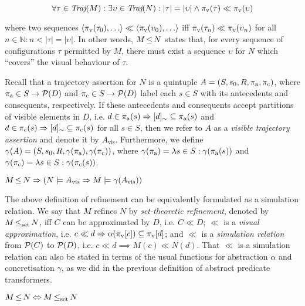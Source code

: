 \begin{equation*}
\forall \tau \in \operatorname{\textit{Traj}}(M) : \exists \upsilon \in \operatorname{\textit{Traj}}(N) : | \tau | = | \upsilon | \wedge \pi_{\textrm{v}}(\tau) \ll \pi_{\textrm{v}}(\upsilon)
\end{equation*}

\noindent where two sequences $\langle \pi_{\textrm{v}}(\tau_{0}), \ldots \rangle \ll \langle \pi_{\textrm{v}}(\upsilon_{0}), \ldots \rangle$ iff $\pi_{\textrm{v}}(\tau_{n}) \ll \pi_{\textrm{v}}(\upsilon_{n})$ for all $n \in \mathbb{N} : n < | \tau | = | \upsilon |$. In other words, $M \operatorname{\leq} N$ states that, for every sequence of configurations $\tau$ permitted by $M$, there must exist a sequence $\upsilon$ for $N$ which ``covers'' the visual behaviour of $\tau$.

Recall that a trajectory assertion for $N$ is a quintuple $A = (S, s_{0}, R, \operatorname{\pi_{\textrm{a}}}, \operatorname{\pi_{\textrm{c}}})$, where $\operatorname{\pi_{\textrm{a}}} \in S \rightarrow \mathcal{P}(D)$ and $\operatorname{\pi_{\textrm{c}}} \in S \rightarrow \mathcal{P}(D)$ label each $s \in S$ with its antecedents and consequents, respectively. If these antecedents and consequents accept partitions of visible elements in $D$, i.e. $d \in \operatorname{\pi_{\textrm{a}}}(s) \Rightarrow [d]_{\sim} \subseteq \operatorname{\pi_{\textrm{a}}}(s)$ and $d \in \operatorname{\pi_{\textrm{c}}}(s) \Rightarrow [d]_{\sim} \subseteq \operatorname{\pi_{\textrm{c}}}(s)$ for all $s \in S$, then we refer to $A$ as a \textit{visible trajectory assertion} and denote it by $A_{\textrm{vis}}$. Furthermore, we define $\gamma(A) = (S, s_{0}, R, \gamma(\operatorname{\pi_{\textrm{a}}}), \gamma(\operatorname{\pi_{\textrm{c}}}))$, where $\gamma(\operatorname{\pi_{\textrm{a}}}) = \lambda s \in S : \gamma(\operatorname{\pi_{\textrm{a}}}(s))$ and $\gamma(\operatorname{\pi_{\textrm{c}}}) = \lambda s \in S : \gamma(\operatorname{\pi_{\textrm{c}}}(s))$.




\begin{theorem} \label{thm:traj-refines}
$M \operatorname{\leq} N \Rightarrow (N \models A_{\textrm{vis}} \Rightarrow M \models \gamma(A_{\textrm{vis}}))$
\end{theorem}

The above definition of refinement can be equivalently formulated as a simulation relation. We say that $M$ refines $N$ by \textit{set-theoretic refinement}, denoted by $M \operatorname{\operatorname{\leq}_{\textrm{set}}} N$, iff $C$ can be approximated by $D$, i.e. $C \ll D$; $\ll$ is a \textit{visual approximation}, i.e. $c \ll d \Rightarrow \alpha(\pi_{\textrm{v}}[c]) \subseteq \pi_{\textrm{v}}[d]$; and $\ll$ is a \textit{simulation relation} from $\mathcal{P}(C)$ to $\mathcal{P}(D)$, i.e. $c \ll d \implies M(c) \ll N(d)$. That $\ll$ is a simulation relation can also be stated in terms of the usual functions for abstraction $\alpha$ and concretisation $\gamma$, as we did in the previous definition of abstract predicate transformers.

\begin{theorem} \label{thm:traj-equal-set}
$M \operatorname{\leq} N \Leftrightarrow M \operatorname{\operatorname{\leq}_{\textrm{set}}} N$
\end{theorem}
